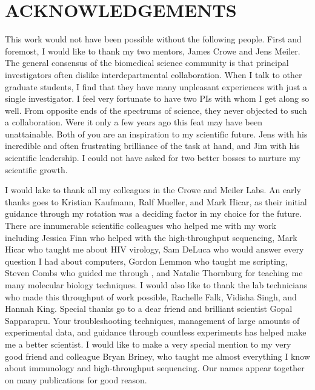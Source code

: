 \chapter*{ACKNOWLEDGEMENTS}
\vspace{7mm}
This work would not have been possible without the following people.
First and foremost, I would like to thank my two mentors, James Crowe and Jens Meiler. The general consensus of the biomedical science community is that principal investigators often dislike interdepartmental collaboration. When I talk to other graduate students, I find that they have many unpleasant experiences with just a single investigator. I feel very fortunate to have two PIs with whom I get along so well. From opposite ends of the spectrums of science, they never objected to such a collaboration. Were it only a few years ago this feat may have been unattainable. Both of you are an inspiration to my scientific future. Jens with his incredible and often frustrating brilliance of the task at hand, and Jim with his scientific leadership. I could not have asked for two better bosses to nurture my scientific growth.

I would lake to thank all my colleagues in the Crowe and Meiler Labs. An early thanks goes to Kristian Kaufmann, Ralf Mueller, and Mark Hicar, as their initial guidance through my rotation was a deciding factor in my choice for the future. There are innumerable scientific colleagues who helped me with my work including Jessica Finn who helped with the high-throughput sequencing, Mark Hicar who taught me about HIV virology, Sam DeLuca who would answer every question I had about computers, Gordon Lemmon who taught me scripting, Steven Combs who guided me through \rosetta, and Natalie Thornburg for teaching me many molecular biology techniques. I would also like to thank the lab technicians who made this throughput of work possible, Rachelle Falk, Vidisha Singh, and Hannah King. Special thanks go to a dear friend and brilliant scientist Gopal Sapparapru. Your troubleshooting techniques, management of large amounts of experimental data, and guidance through countless experiments has helped make me a better scientist. I would like to make a very special mention to my very good friend and colleague Bryan Briney, who taught me almost everything I know about immunology and high-throughput sequencing. Our names appear together on many publications for good reason.


